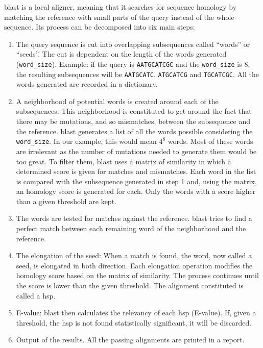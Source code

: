 \gls{blast} is a local aligner, meaning that it searches for sequence homology by matching the reference with small parts of the query instead of the whole sequence.
Its process can be decomposed into six main steps:
\begin{enumerate}
    \item The query sequence is cut into overlapping subsequences called ``words'' or ``seeds''.
    The cut is dependent on the length of the words generated (\texttt{word\_size}).
    Example: if the query is \texttt{AATGCATCGC} and the \texttt{word\_size} is 8, the resulting subsequences will be \texttt{AATGCATC}, \texttt{ATGCATCG} and \texttt{TGCATCGC}.
    All the words generated are recorded in a dictionary.
    \item A neighborhood of potential words is created around each of the subsequences.
    This neighborhood is constituted to get around the fact that there may be mutations, and so mismatches, between the subsequence and the reference.
    \gls{blast} generates a list of all the words possible considering the \texttt{word\_size}.
    In our example, this would mean $4^8$ words.
    Most of these words are irrelevant as the number of mutations needed to generate them would be too great.
    To filter them, \gls{blast} uses a matrix of similarity in which a determined score is given for matches and mismatches.
    Each word in the list is compared with the subsequence generated in step 1 and, using the matrix, an homology score is generated for each.
    Only the words with a score higher than a given threshold are kept.
    \item The words are tested for matches against the reference.
    \gls{blast} tries to find a perfect match between each remaining word of the neighborhood and the reference.
    \item The elongation of the seed:
    When a match is found, the word, now called a seed, is elongated in both direction.
    Each elongation operation modifies the homology score based on the matrix of similarity.
    The process continues until the score is lower than the given threshold.
    The alignment constituted is called a \acrfull{hsp}.
    \item E-value:
    \gls{blast} then calculates the relevancy of each \gls{hsp} (E-value).
    If, given a threshold, the \gls{hsp} is not found statistically significant, it will be discarded.
    \item Output of the results.
    All the passing alignments are printed in a report.
\end{enumerate}


